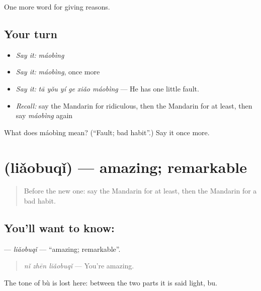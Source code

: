 \begin{grammarlens}[title={What you've built}]
One more word for giving reasons.
\end{grammarlens}

\subsection*{Your turn}
\begin{itemize}
\raggedright
  \item \emph{Say it:} \emph{máobìng}
  \item \emph{Say it:} \emph{máobìng}, once more
  \item \emph{Say it:} \emph{tā yǒu yí ge xiǎo máobìng} — He has one little fault.
  \item \emph{Recall:} say the Mandarin for ridiculous, then the Mandarin for at least, then say \emph{máobìng} again
\end{itemize}

\begin{tcolorbox}[breakable,colback=teal!4,colframe=teal!35!black,title={Before you move on}]
What does máobìng mean? (\textquotedblleft{}Fault; bad habit\textquotedblright{}.) Say it once more.
\end{tcolorbox}
\section[\texorpdfstring{\zh{了不起} (liǎobuqǐ)}{了不起 (liǎobuqǐ)}]{ (liǎobuqǐ) — amazing; remarkable}

\label{lesson:ZH-C368-liaobuqi}



\begin{quote}
Before the new one: say the Mandarin for at least, then the Mandarin for a bad habit.
\end{quote}

\subsection*{You'll want to know: }
\textbf{} — \emph{liǎobuqǐ} — \textquotedblleft{}amazing; remarkable\textquotedblright{}.

\begin{quote}
\textbf{} \emph{nǐ zhēn liǎobuqǐ} — You're amazing.
\end{quote}

The tone of bù is lost here: between the two parts it is said light, bu.

